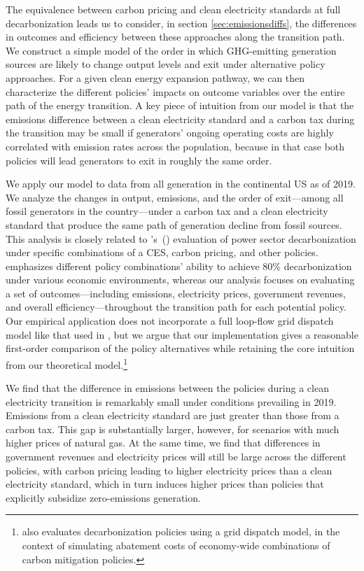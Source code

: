 \documentclass[12pt]{article}
\newcommand\cites[1]{\citeauthor{#1}'s\ (\citeyear{#1})}
\begin{document}
The equivalence between carbon pricing and clean electricity standards at full decarbonization leads us to consider, in section \ref{sec:emissionsdiffs}, the differences in outcomes and efficiency between these approaches along the transition path. We construct a simple model of the order in which GHG-emitting generation sources are likely to change output levels and exit under alternative policy approaches. For a given clean energy expansion pathway, we can then characterize the different policies' impacts on outcome variables over the entire path of the energy transition. A key piece of intuition from our model is that the emissions difference between a clean electricity standard and a carbon tax during the transition may be small if generators' ongoing operating costs are highly correlated with emission rates across the population, because in that case both policies will lead generators to exit in roughly the same order. 

We apply our model to data from all generation in the continental US as of 2019. We analyze the changes in output, emissions, and the order of exit---among all fossil generators in the country---under a carbon tax and a clean electricity standard that produce the same path of generation decline from fossil sources. This analysis is closely related to \cites{stock2021robust} evaluation of power sector decarbonization under specific combinations of a CES, carbon pricing, and other policies. \cite{stock2021robust} emphasizes different policy combinations' ability to achieve 80\% decarbonization under various economic environments, whereas our analysis focuses on evaluating a set of outcomes---including emissions, electricity prices, government revenues, and overall efficiency---throughout the transition path for each potential policy. Our empirical application does not incorporate a full loop-flow grid dispatch model like that used in \cite{stock2021robust}, but we argue that our implementation gives a reasonable first-order comparison of the policy alternatives while retaining the core intuition from our theoretical model.\footnote{\cite{dimanchevknittel2020} also evaluates decarbonization policies using a grid dispatch model, in the context of simulating abatement costs of economy-wide combinations of carbon mitigation policies.}


We find that the difference in emissions between the policies during a clean electricity transition is remarkably small under conditions prevailing in 2019. Emissions from a clean electricity standard are just greater than those from a carbon tax. This gap is substantially larger, however, for scenarios with much higher prices of natural gas. At the same time, we find that differences in government revenues and electricity prices will still be large across the different policies, with carbon pricing leading to higher electricity prices than a clean electricity standard, which in turn induces higher prices than policies that explicitly subsidize zero-emissions generation.
\end{document}
